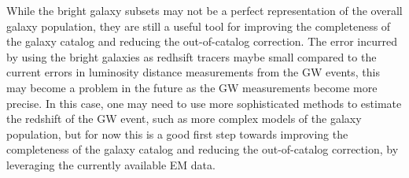 While the bright galaxy subsets may not be a perfect representation of the overall galaxy population, they are still a useful tool for improving the completeness of the galaxy catalog and reducing the out-of-catalog correction. The error incurred by using the bright galaxies as redhsift tracers maybe small compared to the current errors in luminosity distance measurements from the \ac{GW} events, this may become a problem in the future as the \ac{GW} measurements become more precise. In this case, one may need to use more sophisticated methods to estimate the redshift of the \ac{GW} event, such as more complex models of the galaxy population, but for now this is a good first step towards improving the completeness of the galaxy catalog and reducing the out-of-catalog correction, by leveraging the currently available \ac{EM} data.


